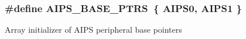 \subsubsection[{\texorpdfstring{A\+I\+P\+S\+\_\+\+B\+A\+S\+E\+\_\+\+P\+T\+RS}{AIPS_BASE_PTRS}}]{\setlength{\rightskip}{0pt plus 5cm}\#define A\+I\+P\+S\+\_\+\+B\+A\+S\+E\+\_\+\+P\+T\+RS~\{ {\bf A\+I\+P\+S0}, {\bf A\+I\+P\+S1} \}}\hypertarget{group__AIPS__Peripheral__Access__Layer_gacdda032ccd174e1d8c1a02b1e0f7a441}{}\label{group__AIPS__Peripheral__Access__Layer_gacdda032ccd174e1d8c1a02b1e0f7a441}
Array initializer of A\+I\+PS peripheral base pointers 